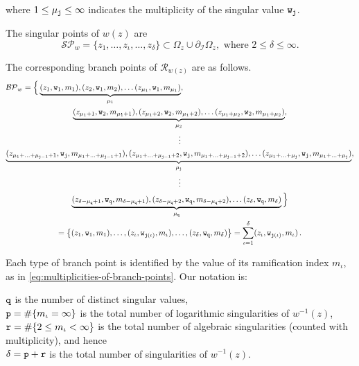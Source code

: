 \documentclass[final,3p,times]{elsarticle}
\newcommand{\R}{\ensuremath{{\mathcal R}}}
\theoremstyle{definition}
\begin{document}
\noindent
where $1\leq\mu_{\tt j}\leq\infty$ indicates the multiplicity of the singular value ${\tt w}_{\tt j}$.

\noindent
The singular points of $w(z)$ are 
\begin{equation}
\mathcal{SP}_w = \{ z_1, \ldots, 
z_\iota , \ldots ,
z_\delta \} 
\subset \Omega_z \cup \partial_{\mathcal{I}} \Omega_z,
\text{ where }
2 \leq \delta \leq \infty.
\end{equation}


\noindent
The corresponding branch points of $\R_{w(z)}$
are as follows.
\begin{multline}
\label{eq:enumerating-branch-points}
\mathcal{BP}_w  = 
\Big\{
\underbrace{(z_1,{\tt w}_1,m_{1}), 
(z_2, {\tt w}_1,m_{2}), 
\ldots (z_{\mu_1}, {\tt w}_1, m_{\mu_1})}_{\mu_1},
\hfill
\\
\underbrace{(z_{\mu_1 + 1},{\tt w}_2,m_{\mu_1 + 1}), 
(z_{\mu_1+2}, {\tt w}_2,m_{\mu_1+2}), 
\ldots (z_{\mu_1+\mu_2}, {\tt w}_2, m_{\mu_1+\mu_2})}_{\mu_2},
\\
\vdots
\\
\underbrace{(z_{\mu_1 +\ldots+\mu_{{\tt j}-1} + 1},{\tt w}_{\tt j} ,m_{\mu_1 + \ldots+\mu_{{\tt j}-1} + 1}), 
(z_{\mu_1 + \ldots + \mu_{{\tt j}-1}+2}, {\tt w}_{\tt j} ,m_{\mu_1 + \ldots+\mu_{{\tt j}-1}+2}), 
\ldots (z_{\mu_1 + \ldots+\mu_{\tt j}}, {\tt w}_{\tt j}, m_{\mu_1 + \ldots+\mu_{\tt j} })}_{\mu_{\tt j}},
\\
\vdots
\\
\underbrace{(z_{\delta-\mu_{\tt q} + 1}, {\tt w}_{\tt q}, m_{\delta-\mu_{\tt q}+ 1 }), 
(z_{\delta-\mu_{\tt q} + 2}, {\tt w}_{\tt q}, m_{\delta-\mu_{\tt q}+2 }),
\ldots (z_\delta, {\tt w}_{\tt q}, m_{\delta })}_{\mu_{\tt q}} 
\Big\}
\\
= 
\big\{
( z_1, {\tt w}_1, m_{1} ), \ldots, ( z_\iota, {\tt w}_{ {\tt j}(\iota) }, m_{\iota} ),\ldots, ( z_\delta, {\tt w}_{\tt q}, m_{\delta} )
\big\}
=\sum_{\iota=1}^{\delta} ( z_\iota, {\tt w}_{{\tt j}(\iota)}, m_{\iota} )\, .
\end{multline}


\noindent
Each type of branch point is identified by the value of its ramification index $m_{\iota}$,
as in \eqref{eq:multiplicities-of-branch-points}.
Our notation is:

\noindent
${\tt q}$ is the number of distinct singular values, 
\\
${\tt p}= \#\{m_{\iota}=\infty\}$ is the total number of logarithmic singularities of $w^{-1}(z)$,
\\
${\tt r} = \#\{2\leq m_{\iota} < \infty\}$ is the total number of algebraic singularities (counted with multiplicity), and hence 
\\
$\delta = {\tt p}+ {\tt r}$ 
is the total number of singularities of $w^{-1}(z)$. 
\end{document}
